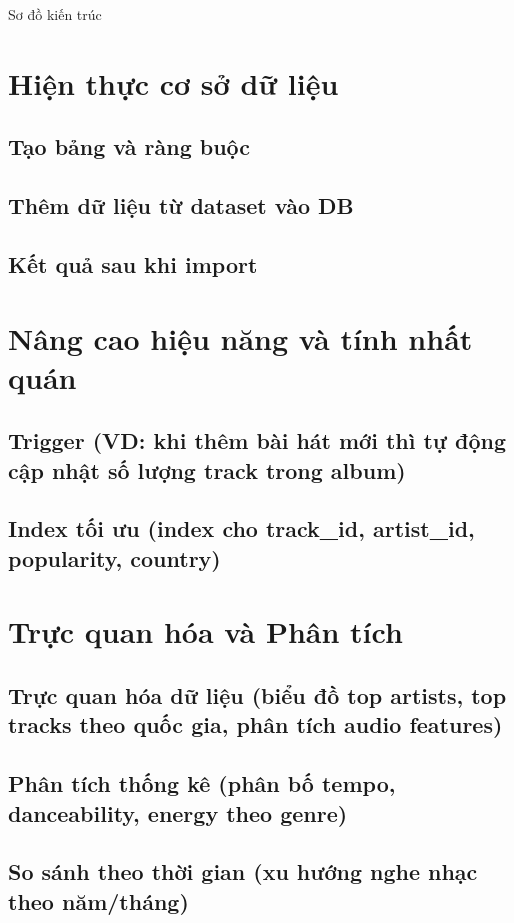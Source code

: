 \documentclass{latex/hcmut-report}
\begin{document}
Sơ đồ kiến trúc

\section{Hiện thực cơ sở dữ liệu}
\subsection{Tạo bảng và ràng buộc}
\subsection{Thêm dữ liệu từ dataset vào DB}
\subsection{Kết quả sau khi import}

\section{Nâng cao hiệu năng và tính nhất quán}
\subsection{Trigger (VD: khi thêm bài hát mới thì tự động cập nhật số lượng track trong album)}
\subsection{Index tối ưu (index cho track_id, artist_id, popularity, country)}

\section{Trực quan hóa và Phân tích}
\subsection{Trực quan hóa dữ liệu (biểu đồ top artists, top tracks theo quốc gia, phân tích audio features)
}

\subsection{Phân tích thống kê (phân bố tempo, danceability, energy theo genre)}

\subsection{So sánh theo thời gian (xu hướng nghe nhạc theo năm/tháng)}
\end{document}
